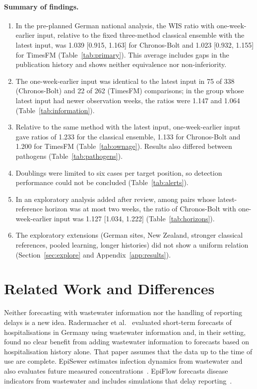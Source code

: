 \documentclass[11pt]{article}
\begin{document}
\paragraph{Summary of findings.}
\begin{enumerate}[leftmargin=*,itemsep=2pt]
\item In the pre-planned German national analysis, the WIS ratio with one-week-earlier input, relative to the fixed three-method classical ensemble with the latest input, was 1.039 [0.915, 1.163] for Chronos-Bolt and 1.023 [0.932, 1.155] for TimesFM (Table~\ref{tab:primary}). This average includes gaps in the publication history and shows neither equivalence nor non-inferiority.
\item The one-week-earlier input was identical to the latest input in 75 of 338 (Chronos-Bolt) and 22 of 262 (TimesFM) comparisons; in the group whose latest input had newer observation weeks, the ratios were 1.147 and 1.064 (Table~\ref{tab:information}).
\item Relative to the same method with the latest input, one-week-earlier input gave ratios of 1.233 for the classical ensemble, 1.133 for Chronos-Bolt and 1.200 for TimesFM (Table~\ref{tab:ownage}). Results also differed between pathogens (Table~\ref{tab:pathogens}).
\item Doublings were limited to six cases per target position, so detection performance could not be concluded (Table~\ref{tab:alerts}).
\item In an exploratory analysis added after review, among pairs whose latest-reference horizon was at most two weeks, the ratio of Chronos-Bolt with one-week-earlier input was 1.127 [1.034, 1.222] (Table~\ref{tab:horizons}).
\item The exploratory extensions (German sites, New Zealand, stronger classical references, pooled learning, longer histories) did not show a uniform relation (Section~\ref{sec:explore} and Appendix~\ref{app:results}).
\end{enumerate}

\section{Related Work and Differences}

Neither forecasting with wastewater information nor the handling of reporting delays is a new idea. Radermacher et al.~\cite{radermacher2025} evaluated short-term forecasts of hospitalisations in Germany using wastewater information and, in their setting, found no clear benefit from adding wastewater information to forecasts based on hospitalisation history alone. That paper assumes that the data up to the time of use are complete. EpiSewer estimates infection dynamics from wastewater and also evaluates future measured concentrations~\cite{lison2026}. EpiFlow forecasts disease indicators from wastewater and includes simulations that delay reporting~\cite{adiga2026}.
\end{document}
